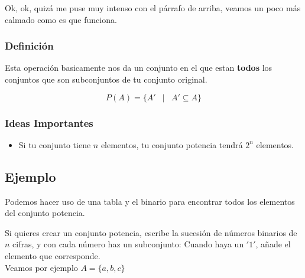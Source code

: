 \documentclass[12pt]{report}                                    %
\DeclareMathOperator \Space {\quad}                             %
\DeclareMathOperator \MiniSpace {\;}                            %
\newcommand \Such {\MiniSpace|\MiniSpace}                       %
\begin{document}
            Ok, ok, quizá me puse muy intenso con el párrafo de arriba, veamos un poco más calmado
            como es que funciona.

            \subsubsection*{Definición}

                Esta operación basicamente nos da un conjunto en el que estan \textbf{todos} los
                conjuntos que son subconjuntos de tu conjunto original.

                \begin{equation}
                    P(A) = \{ A' \Such A' \subseteq A \}
                \end{equation}

            \subsubsection*{Ideas Importantes}

            \begin{itemize}
                \item Si tu conjunto tiene $n$ elementos, tu conjunto potencia tendrá $2^n$ elementos.
            \end{itemize}

            \clearpage
            \subsection*{Ejemplo}

                Podemos hacer uso de una tabla y el binario para encontrar todos los
                elementos del conjunto potencia.

                Si quieres crear un conjunto potencia, escribe la sucesión de números binarios de $n$ cifras,
                y con cada número haz un subconjunto: Cuando haya un $'1'$, añade el elemento que corresponde.\\

                Veamos por ejemplo $A = \{a, b, c\}$ \\
\end{document}
